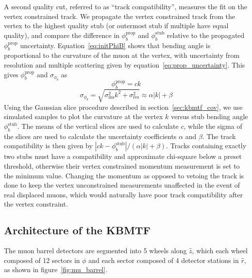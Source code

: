 A second quality cut, referred to as ``track compatibility'', measures the fit on the vertex constrained track. We propagate the vertex constrained track from the vertex to the highest quality stub (or outermost stub if multiple have equal quality), and compare the difference in $\phi_b^\text{prop}$ and $\phi_b^\text{stub}$ relative to the propagated $\phi_b^\text{prop}$ uncertainty. Equation~\ref{eq:initPhiB} shows that bending angle is proportional to the curvature of the muon at the vertex, with uncertainty from resolution and multiple scattering given by equation~\ref{eq:prop_uncertainty}. This gives $\phi_b^\text{prop}$ and $\sigma_{\phi_b}$ as
\begin{equation}
	\phi_b^\text{prop}=ck
\end{equation}
\begin{equation}
	\sigma_{\phi_b}=\sqrt{\sigma_\text{ms}^2k^2+\sigma_\text{res}^2}\approx\alpha|k|+\beta
\end{equation}
Using the Gaussian slice procedure described in section~\ref{sec:kbmtf_cov}, we use simulated samples to plot the curvature at the vertex $k$ versus stub bending angle $\phi_b^\text{stub}$. The means of the vertical slices are used to calculate $c$, while the sigma of the slices are used to calculate the uncertainty coefficients $\alpha$ and $\beta$. The track compatibility is then given by $|ck-\phi_b^\text{stub}|/(\alpha|k|+\beta)$. Tracks containing exactly two stubs must have a compatibility and approximate chi-square below a preset threshold, otherwise their vertex constrained momentum measurement is set to the minimum value. Changing the momentum as opposed to vetoing the track is done to keep the vertex unconstrained measurements unaffected in the event of real displaced muons, which would naturally have poor track compatibility after the vertex constraint.

\subsection{Architecture of the KBMTF} \label{sec:kmtf_architecture}
The muon barrel detectors are segmented into 5 wheels along $\hat{z}$, which each wheel composed of 12 sectors in $\phi$ and each sector composed of 4 detector stations in $\hat{r}$, as shown in figure~\ref{fig:mu_barrel}.

